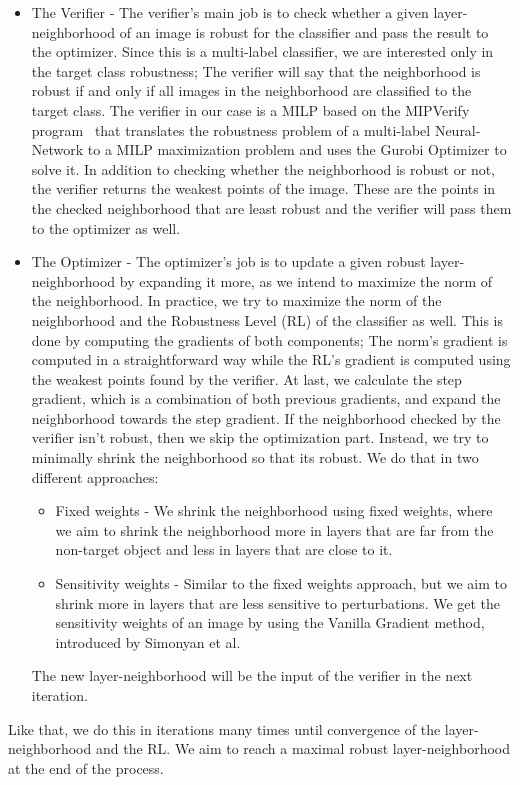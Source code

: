 \documentclass[11pt]{article}
\begin{document}
\begin{itemize}
    \item The Verifier - The verifier's main job is to check whether a given layer-neighborhood of an image is robust for the classifier and pass the result to the optimizer.
    Since this is a multi-label classifier, we are interested only in the target class robustness;
    The verifier will say that the neighborhood is robust if and only if all images in the neighborhood are classified to the target class.
    The verifier in our case is a MILP based on the MIPVerify program~\cite{MIPVERIFY} that translates the robustness problem of a multi-label Neural-Network to a MILP maximization problem and uses the Gurobi Optimizer to solve it.
    In addition to checking whether the neighborhood is robust or not, the verifier returns the weakest points of the image.
    These are the points in the checked neighborhood that are least robust and the verifier will pass them to the optimizer as well.
    \item The Optimizer - The optimizer's job is to update a given robust layer-neighborhood by expanding it more, as we intend to maximize the norm of the neighborhood.
    In practice, we try to maximize the norm of the neighborhood and the Robustness Level (RL) of the classifier as well.
    This is done by computing the gradients of both components;
    The norm's gradient is computed in a straightforward way while the RL's gradient is computed using the weakest points found by the verifier.
    At last, we calculate the step gradient, which is a combination of both previous gradients, and expand the neighborhood towards the step gradient.
    If the neighborhood checked by the verifier isn't robust, then we skip the optimization part.
    Instead, we try to minimally shrink the neighborhood so that its robust.
    We do that in two different approaches:
    \begin{itemize}
        \item Fixed weights - We shrink the neighborhood using fixed weights, where we aim to shrink the neighborhood more in layers that are far from the non-target object and less in layers that are close to it.
        \item Sensitivity weights - Similar to the fixed weights approach, but we aim to shrink more in layers that are less sensitive to perturbations.
        We get the sensitivity weights of an image by using the Vanilla Gradient method, introduced by Simonyan et al.~\cite{VANILLAGRADIENT}
    \end{itemize}
    The new layer-neighborhood will be the input of the verifier in the next iteration.
\end{itemize}
Like that, we do this in iterations many times until convergence of the layer-neighborhood and the RL\@.
We aim to reach a maximal robust layer-neighborhood at the end of the process.
\end{document}
